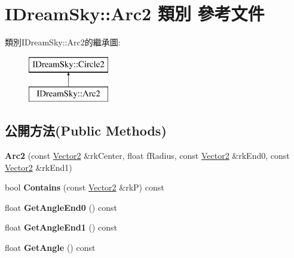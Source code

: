 \hypertarget{class_i_dream_sky_1_1_arc2}{}\section{I\+Dream\+Sky\+:\+:Arc2 類別 參考文件}
\label{class_i_dream_sky_1_1_arc2}
類別\+I\+Dream\+Sky\+:\+:Arc2的繼承圖\+:\begin{figure}[H]
\begin{center}
\leavevmode
\includegraphics[height=2.000000cm]{class_i_dream_sky_1_1_arc2}
\end{center}
\end{figure}
\subsection*{公開方法(Public Methods)}
\begin{DoxyCompactItemize}
\item 
{\bfseries Arc2} (const \hyperlink{class_i_dream_sky_1_1_vector2}{Vector2} \&rk\+Center, float f\+Radius, const \hyperlink{class_i_dream_sky_1_1_vector2}{Vector2} \&rk\+End0, const \hyperlink{class_i_dream_sky_1_1_vector2}{Vector2} \&rk\+End1)\hypertarget{class_i_dream_sky_1_1_arc2_afae9a0c77a3175fbca5be625c6127a25}{}\label{class_i_dream_sky_1_1_arc2_afae9a0c77a3175fbca5be625c6127a25}

\item 
bool {\bfseries Contains} (const \hyperlink{class_i_dream_sky_1_1_vector2}{Vector2} \&rkP) const \hypertarget{class_i_dream_sky_1_1_arc2_aaaf056f9e0f9bba716d56131397bfab8}{}\label{class_i_dream_sky_1_1_arc2_aaaf056f9e0f9bba716d56131397bfab8}

\item 
float {\bfseries Get\+Angle\+End0} () const \hypertarget{class_i_dream_sky_1_1_arc2_aa867ac847bd0f5a468730dbf624facf2}{}\label{class_i_dream_sky_1_1_arc2_aa867ac847bd0f5a468730dbf624facf2}

\item 
float {\bfseries Get\+Angle\+End1} () const \hypertarget{class_i_dream_sky_1_1_arc2_a34101ca5668c943b25bb63e520a4b641}{}\label{class_i_dream_sky_1_1_arc2_a34101ca5668c943b25bb63e520a4b641}

\item 
float {\bfseries Get\+Angle} () const \hypertarget{class_i_dream_sky_1_1_arc2_a1b9273acc67099ca842bf440e45297f6}{}\label{class_i_dream_sky_1_1_arc2_a1b9273acc67099ca842bf440e45297f6}

\end{DoxyCompactItemize}

